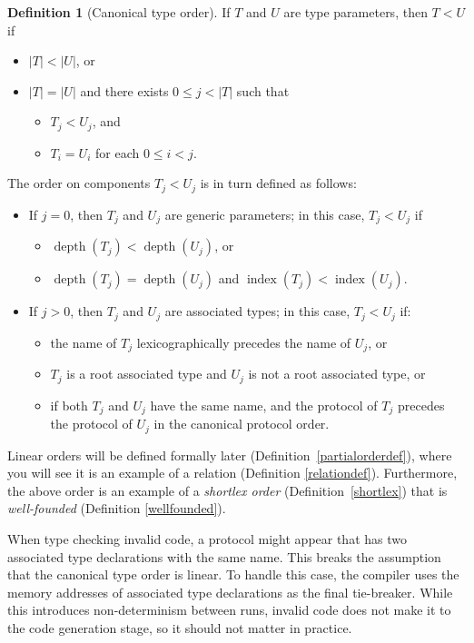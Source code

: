 \documentclass[headsepline,bibliography=totoc]{scrreport}
\DeclareMathOperator{\gpdepth}{depth}
\DeclareMathOperator{\gpindex}{index}
\theoremstyle{definition}
\theoremstyle{definition}
\newtheorem{definition}{Definition}[chapter]
\theoremstyle{definition}
\begin{document}
\begin{definition}[Canonical type order]\label{canonicaltypeorder} If $T$ and $U$ are type parameters, then $T < U$ if
\begin{itemize}
\item $|T| < |U|$, or
\item $|T|=|U|$ and there exists $0\le j < |T|$ such that
\begin{itemize}
\item $T_j<U_j$, and
\item $T_i=U_i$ for each $0\le i<j$.
\end{itemize}
\end{itemize}
The order on components $T_j<U_j$ is in turn defined as follows:
\begin{itemize}
\item If $j=0$, then $T_j$ and $U_j$ are generic parameters; in this case, $T_j<U_j$ if
\begin{itemize}
\item $\gpdepth(T_j)<\gpdepth(U_j)$, or
\item $\gpdepth(T_j)=\gpdepth(U_j)$ and $\gpindex(T_j)<\gpindex(U_j)$.
\end{itemize}
\item If $j>0$, then $T_j$ and $U_j$ are associated types; in this case, $T_j<U_j$ if:
\begin{itemize}
\item the name of $T_j$ lexicographically precedes the name of $U_j$, or
\item $T_j$ is a root associated type and $U_j$ is not a root associated type, or
\item if both $T_j$ and $U_j$ have the same name, and the protocol of $T_j$ precedes the protocol of $U_j$ in the canonical protocol order.
\end{itemize}
\end{itemize}
\end{definition}

Linear orders will be defined formally later (Definition~\ref{partialorderdef}), where you will see it is an example of a relation (Definition \ref{relationdef}). Furthermore, the above order is an example of a \emph{shortlex order} (Definition~\ref{shortlex}) that is \emph{well-founded} (Definition \ref{wellfounded}).

\begin{leftbar}\noindent When type checking invalid code, a protocol might appear that has two associated type declarations with the same name. This breaks the assumption that the canonical type order is linear. To handle this case, the compiler uses the memory addresses of associated type declarations as the final tie-breaker. While this introduces non-determinism between runs, invalid code does not make it to the code generation stage, so it should not matter in practice.
\end{leftbar}
\end{document}

